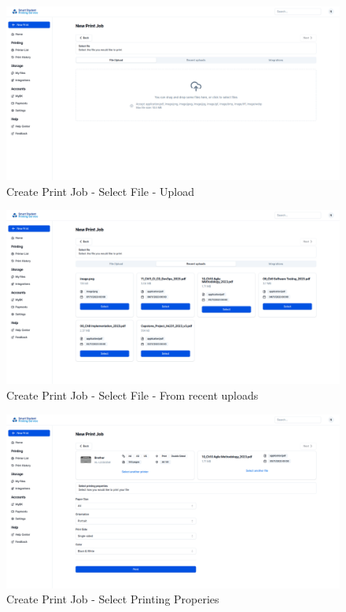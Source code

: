 \begin{figure}[H]
    \centering
    \includegraphics[max width = 0.9\linewidth,origin = c]{chapters/8. Implementation - Sprint 2/3. Create print job - select file - upload.png}
    \caption{Create Print Job - Select File - Upload}%
\end{figure}
\begin{figure}[H]
    \centering
    \includegraphics[max width = 0.9\linewidth,origin = c]{chapters/8. Implementation - Sprint 2/4. Create print job - select file - recent.png}
    \caption{Create Print Job - Select File - From recent uploads}%
\end{figure}
\begin{figure}[H]
    \centering
    \includegraphics[max width = 0.9\linewidth,origin = c]{chapters/8. Implementation - Sprint 2/5. Create print job - select properties.png}
    \caption{Create Print Job - Select Printing Properies}%
\end{figure}

